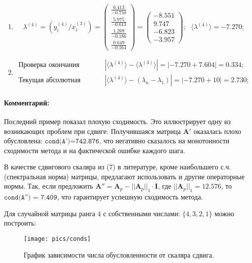 \begin{enumerate}
    \item $$
    \lambda^{(4)} =\left( y^{(4)}_i / x^{(3)}_i \right) =
    \begin{pmatrix} \frac{6.413}{-0.750}\\\frac{5.975}{-0.613}\\\frac{1.269}{-0.186}\\\frac{0.649}{-0.164}\end{pmatrix}=
    \begin{pmatrix}-8.551\\9.747\\-6.823\\-3.957\end{pmatrix}; ~~~
    \langle\lambda^{(4)}\rangle = -7.270;$$

    \item $$
    \begin{matrix}
        \text{Проверка окончания алгоритма: }&|\langle\lambda^{(4)}\rangle - \langle\lambda^{(3)}\rangle| = |-7.270+7.604|     =    \mathbf{0.334};\\
        \text{Текущая абсолютная ошибка: }&|\langle\lambda^{(4)}\rangle - (\lambda_n-\lambda_1)| = |  -7.270 +10| = \mathbf{2.730};
    \end{matrix}$$
\end{enumerate}

\paragraph{Комментарий:} Последний пример показал плохую сходимость. Это иллюстрирует одну из возникающих проблем при сдвиге: Получившаяся матрица $\mathbf{A'}$ оказалась плохо обусловлена: $\texttt{cond(A')=742.876}$, что негативно сказалось на монотонности сходимости метода и на фактической ошибке каждого шага.

В качестве сдвигового скаляра из (7) в литературе, кроме наибольшего с.ч. (спектральная норма) матрицы, предлагают использовать и другие операторные нормы. Так, если предложить $\mathbf{A''} = \mathbf{A}_p - ||\mathbf{A}_p||_1\cdot \mathbf{I}$, где $||\mathbf{A}_p||_1=12.576$, то $\texttt{cond(A'') = 7.409}$, что гарантирует успешную сходимость метода.

Для случайной матрицы ранга 4 с собственными числами: $\{4,3,2,1\}$ можно построить:
\begin{figure}[H]
    \centering
    \caption{График зависимости числа обусловленности от скаляра сдвига.}
    \texttt{[image: pics/conds]}
\end{figure}